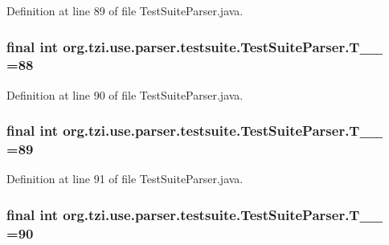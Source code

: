 Definition at line 89 of file Test\-Suite\-Parser.\-java.

\hypertarget{classorg_1_1tzi_1_1use_1_1parser_1_1testsuite_1_1_test_suite_parser_a24758ba7476fea6e34cb017f7938d499}{
\subsubsection[{T\-\_\-\-\_\-88}]{\setlength{\rightskip}{0pt plus 5cm}final int org.\-tzi.\-use.\-parser.\-testsuite.\-Test\-Suite\-Parser.\-T\-\_\-\-\_ =88\hspace{0.3cm}{\ttfamily [static]}}}\label{classorg_1_1tzi_1_1use_1_1parser_1_1testsuite_1_1_test_suite_parser_a24758ba7476fea6e34cb017f7938d499}


Definition at line 90 of file Test\-Suite\-Parser.\-java.

\hypertarget{classorg_1_1tzi_1_1use_1_1parser_1_1testsuite_1_1_test_suite_parser_a37a09f4dc9b5e718de5904b4f3c9411d}{
\subsubsection[{T\-\_\-\-\_\-89}]{\setlength{\rightskip}{0pt plus 5cm}final int org.\-tzi.\-use.\-parser.\-testsuite.\-Test\-Suite\-Parser.\-T\-\_\-\-\_ =89\hspace{0.3cm}{\ttfamily [static]}}}\label{classorg_1_1tzi_1_1use_1_1parser_1_1testsuite_1_1_test_suite_parser_a37a09f4dc9b5e718de5904b4f3c9411d}


Definition at line 91 of file Test\-Suite\-Parser.\-java.

\hypertarget{classorg_1_1tzi_1_1use_1_1parser_1_1testsuite_1_1_test_suite_parser_a4043ecc8d89ce12320ac2d08a8fe0c54}{
\subsubsection[{T\-\_\-\-\_\-90}]{\setlength{\rightskip}{0pt plus 5cm}final int org.\-tzi.\-use.\-parser.\-testsuite.\-Test\-Suite\-Parser.\-T\-\_\-\-\_ =90\hspace{0.3cm}{\ttfamily [static]}}}\label{classorg_1_1tzi_1_1use_1_1parser_1_1testsuite_1_1_test_suite_parser_a4043ecc8d89ce12320ac2d08a8fe0c54}


